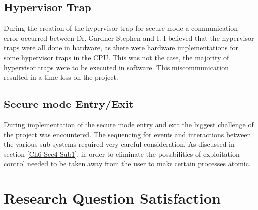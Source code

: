 \subsection{Hypervisor Trap}

\label{Ch7 Sec2 Sub2}

During the creation of the hypervisor trap for secure mode a communication error occurred between Dr. Gardner-Stephen and I. I believed that the hypervisor traps were all done in hardware, as there were hardware implementations for some hypervisor traps in the CPU. This was not the case, the majority of hypervisor traps were to be executed in software. This miscommunication resulted in a time loss on the project.

\subsection{Secure mode Entry/Exit}

\label{Ch7 Sec2 Sub3}

During implementation of the secure mode entry and exit the biggest challenge of the project was encountered. The sequencing for events and interactions between the various sub-systems required very careful consideration. As discussed in section \ref{Ch6 Sec4 Sub1}, in order to eliminate the possibilities of exploitation control needed to be taken away from the user to make certain processes atomic.


\section{Research Question Satisfaction}

\label{Ch7 Sec3}

